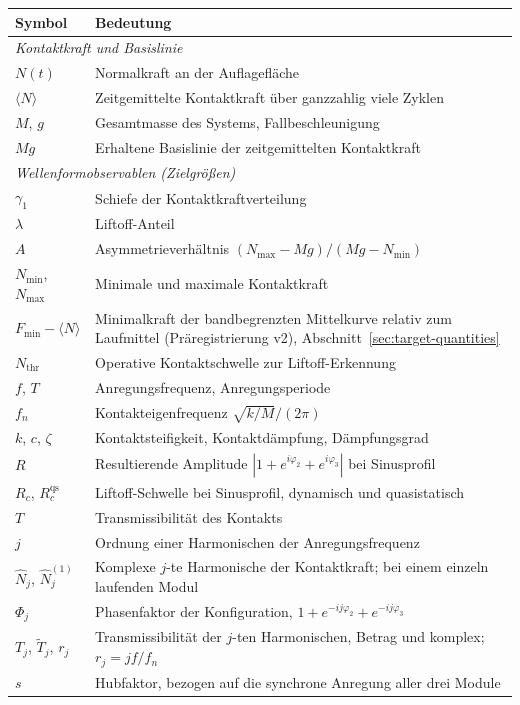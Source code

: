 \documentclass[12pt,a4paper]{report}
\begin{document}
\begin{longtable}{@{}p{}p{}@{}}
\textbf{Symbol} & \textbf{Bedeutung} \\ \hline
\endhead

\multicolumn{2}{l}{\emph{Kontaktkraft und Basislinie}} \\
$N(t)$ & Normalkraft an der Auflagefläche \\
$\langle N \rangle$ & Zeitgemittelte Kontaktkraft über ganzzahlig viele Zyklen \\
$M$, $g$ & Gesamtmasse des Systems, Fallbeschleunigung \\
$Mg$ & Erhaltene Basislinie der zeitgemittelten Kontaktkraft \\

\multicolumn{2}{l}{\emph{Wellenformobservablen (Zielgrößen)}} \\
$\gamma_1$ & Schiefe der Kontaktkraftverteilung \\
$\lambda$ & Liftoff-Anteil \\
$A$ & Asymmetrieverhältnis $(N_{\max}-Mg)/(Mg-N_{\min})$ \\
$N_{\min}$, $N_{\max}$ & Minimale und maximale Kontaktkraft \\
$F_{\min} - \langle N \rangle$ & Minimalkraft der bandbegrenzten Mittelkurve relativ zum Laufmittel (Präregistrierung v2), Abschnitt~\ref{sec:target-quantities} \\
$N_{\text{thr}}$ & Operative Kontaktschwelle zur Liftoff-Erkennung \\
$f$, $T$ & Anregungsfrequenz, Anregungsperiode \\
$f_n$ & Kontakteigenfrequenz $\sqrt{k/M}/(2\pi)$ \\
$k$, $c$, $\zeta$ & Kontaktsteifigkeit, Kontaktdämpfung, Dämpfungsgrad \\
$R$ & Resultierende Amplitude $|1+e^{i\varphi_2}+e^{i\varphi_3}|$ bei Sinusprofil \\
$R_c$, $R_c^{\text{qs}}$ & Liftoff-Schwelle bei Sinusprofil, dynamisch und quasistatisch \\
$T$ & Transmissibilität des Kontakts \\
$j$ & Ordnung einer Harmonischen der Anregungsfrequenz \\
$\hat{N}_j$, $\hat{N}_j^{(1)}$ & Komplexe $j$-te Harmonische der Kontaktkraft; bei einem einzeln laufenden Modul \\
$\Phi_j$ & Phasenfaktor der Konfiguration, $1 + e^{-ij\varphi_2} + e^{-ij\varphi_3}$ \\
$T_j$, $\tilde{T}_j$, $r_j$ & Transmissibilität der $j$-ten Harmonischen, Betrag und komplex; $r_j = jf/f_n$ \\
$s$ & Hubfaktor, bezogen auf die synchrone Anregung aller drei Module \\


\end{longtable}
\end{document}
